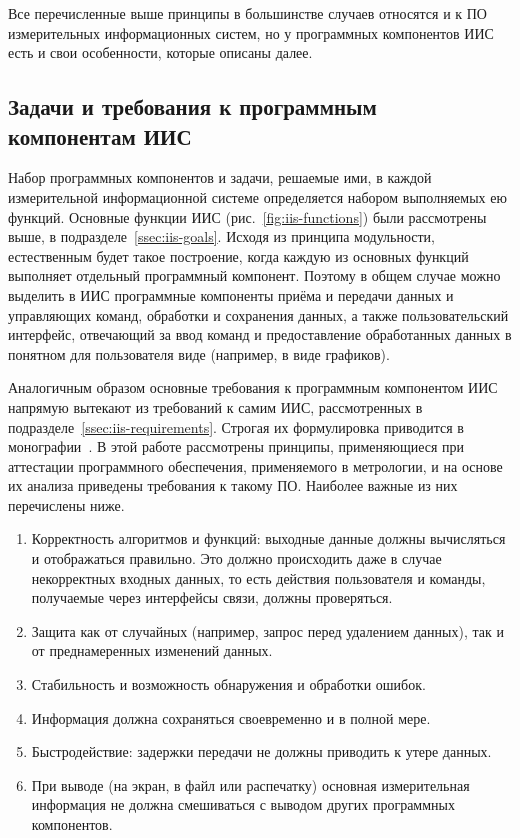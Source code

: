 \documentclass[a4paper, 14pt, titlepage]{extarticle}
\begin{document}

  Все перечисленные выше принципы в большинстве случаев относятся и к ПО измерительных информационных
  систем, но у программных компонентов ИИС есть и свои особенности, которые описаны далее.


  \subsection{Задачи и требования к программным компонентам ИИС}

  Набор программных компонентов и задачи, решаемые ими, в каждой измерительной информационной
  системе определяется набором выполняемых ею функций.
  Основные функции ИИС (рис.~\ref{fig:iis-functions}) были рассмотрены выше, в подразделе~\ref{ssec:iis-goals}.
  Исходя из принципа модульности, естественным будет такое построение, когда каждую из основных функций выполняет
  отдельный программный компонент. Поэтому в общем случае можно выделить в ИИС программные
  компоненты приёма и передачи данных и управляющих команд, обработки и сохранения данных, а также
  пользовательский интерфейс, отвечающий за ввод команд и предоставление обработанных данных в
  понятном для пользователя виде (например, в виде графиков).

  Аналогичным образом основные требования к программным компонентом ИИС напрямую вытекают из
  требований к самим ИИС, рассмотренных в подразделе~\ref{ssec:iis-requirements}. Строгая их
  формулировка приводится в монографии~\cite{slaev-soft-cert}. В этой работе рассмотрены принципы,
  применяющиеся при аттестации программного обеспечения, применяемого
  в метрологии, и на основе их анализа приведены требования к такому ПО. Наиболее важные из них
  перечислены ниже.

  \begin{enumerate}
    \item Корректность алгоритмов и функций: выходные данные должны вычисляться и отображаться
      правильно. Это должно происходить даже в случае некорректных входных данных, то есть действия
      пользователя и команды, получаемые через интерфейсы связи, должны проверяться.
    \item Защита как от случайных (например, запрос перед удалением данных), так и от преднамеренных
      изменений данных.
    \item Стабильность и возможность обнаружения и обработки ошибок.
    \item Информация должна сохраняться своевременно и в полной мере.
    \item Быстродействие: задержки передачи не должны приводить к утере данных.
    \item При выводе (на экран, в файл или распечатку) основная измерительная информация не должна
      смешиваться с выводом других программных компонентов.
  \end{enumerate}
\end{document}
